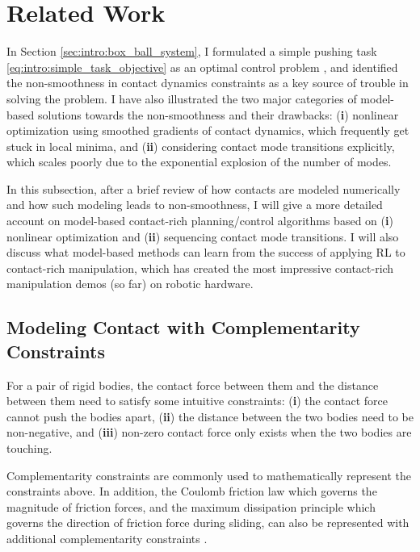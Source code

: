 \section{Related Work}
In Section \ref{sec:intro:box_ball_system}, I formulated a simple pushing task \eqref{eq:intro:simple_task_objective} as an optimal control problem \cite[]{underactuated}, and identified the non-smoothness in contact dynamics constraints as a key source of trouble in solving the problem. I have also illustrated the two major categories of model-based solutions towards the non-smoothness and their drawbacks: (\textbf{i}) nonlinear optimization using smoothed gradients of contact dynamics, which frequently get stuck in local minima, and (\textbf{ii}) considering contact mode transitions explicitly, which scales poorly due to the exponential explosion of the number of modes. 

In this subsection, after a brief review of how contacts are modeled numerically and how such modeling leads to non-smoothness, I will give a more detailed account on model-based contact-rich planning/control algorithms based on (\textbf{i}) nonlinear optimization and (\textbf{ii}) sequencing contact mode transitions. I will also discuss what model-based methods can learn from the success of applying RL to contact-rich manipulation, which has created the most impressive contact-rich manipulation demos (so far) on robotic hardware.


\subsection{Modeling Contact with Complementarity Constraints} 
\label{sec:intro:complementarity_constraints}
For a pair of rigid bodies, the contact force between them and the distance between them need to satisfy some intuitive constraints: (\textbf{i}) the contact force cannot push the bodies apart, (\textbf{ii}) the distance between the two bodies need to be non-negative, and (\textbf{iii}) non-zero contact force only exists when the two bodies are touching. 

Complementarity constraints are commonly used to mathematically represent the constraints above. In addition, the Coulomb friction law which governs the magnitude of friction forces, and the maximum dissipation principle which governs the direction of friction force during sliding, can also be represented with additional complementarity constraints \cite{stewart2000rigid, anitescu1997formulating}.

